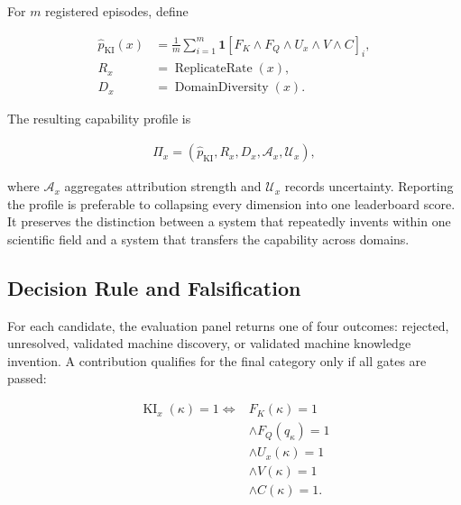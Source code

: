 For $m$ registered episodes, define

\begin{equation}
\begin{aligned}
\widehat{p}_{\mathrm{KI}}(x)
&=\frac{1}{m}\sum_{i=1}^{m}
\mathbf{1}[F_K\land F_Q\land U_x\land V\land C]_i,\\
R_x&=\operatorname{ReplicateRate}(x),\\
D_x&=\operatorname{DomainDiversity}(x).
\end{aligned}
\label{eq:capability_profile}
\end{equation}

The resulting capability profile is

\begin{equation}
\begin{aligned}
\Pi_x=
(\widehat{p}_{\mathrm{KI}},R_x,D_x,
\mathcal{A}_x,\mathcal{U}_x),
\end{aligned}
\label{eq:evaluation_profile}
\end{equation}

where $\mathcal{A}_x$ aggregates attribution strength and $\mathcal{U}_x$
records uncertainty. Reporting the profile is preferable to collapsing every
dimension into one leaderboard score. It preserves the distinction between a
system that repeatedly invents within one scientific field and a system that
transfers the capability across domains.

\subsection{\textbf{Decision Rule and Falsification}}

For each candidate, the evaluation panel returns one of four outcomes:
rejected, unresolved, validated machine discovery, or validated machine
knowledge invention. A contribution qualifies for the final category only if
all gates are passed:

\begin{equation}
\begin{aligned}
\operatorname{KI}_{x}(\kappa)=1
\Longleftrightarrow{}&
F_K(\kappa)=1\\
&\land F_Q(q_\kappa)=1\\
&\land U_x(\kappa)=1\\
&\land V(\kappa)=1\\
&\land C(\kappa)=1.
\end{aligned}
\label{eq:evaluation_gates}
\end{equation}

